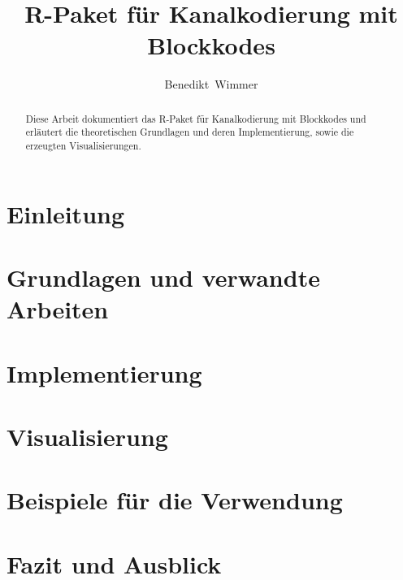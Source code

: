 \documentclass[germanthesis]{thesis-style}
\author{Benedikt~Wimmer}
\title{R-Paket für Kanalkodierung mit Blockkodes}
\begin{document}
\maketitle

\begin{abstract}
Diese Arbeit dokumentiert das R-Paket für Kanalkodierung mit Blockkodes und erläutert die theoretischen Grundlagen und deren Implementierung, sowie die erzeugten Visualisierungen.
\end{abstract}
%

\tableofcontents
\cleardoublepage
{}

\chapter{Einleitung}
\label{chapter:introduction}





\chapter{Grundlagen und verwandte Arbeiten}
\label{chapter:theory}


\chapter{Implementierung}
\label{chapter:implementation}


\chapter{Visualisierung}
\label{chapter:visualization}


\chapter{Beispiele für die Verwendung}
\label{chapter:examples}


\chapter{Fazit und Ausblick}
\label{chapter:conclusion}

\end{document}
